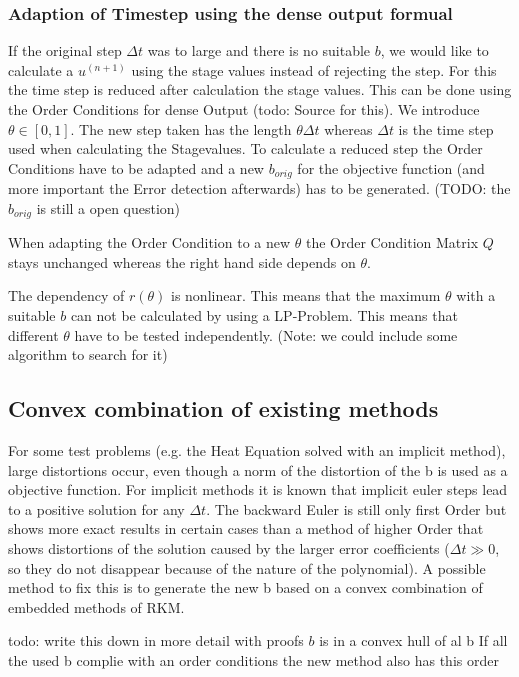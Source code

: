 \documentclass{article}
\begin{document}
\subsubsection{Adaption of Timestep using the dense output formual}

If the original step $\Delta t$ was to large and there is no suitable $b$, we would like to calculate a $u^(n+1)$ using the stage values instead of rejecting the step. For this the time step is reduced after calculation the stage values. This can be done using the Order Conditions for dense Output (todo: Source for this).
We introduce $\theta \in [0,1]$. The new step taken has the length $\theta \Delta t$ whereas $\Delta t$ is the time step used when calculating the Stagevalues.
To calculate a reduced step the Order Conditions have to be adapted and a new $b_{orig}$ for the objective function (and more important the Error detection afterwards) has to be generated. 
(TODO: the $b_{orig}$ is still a open question)

When adapting the Order Condition to a new $\theta$ the Order Condition Matrix $Q$ stays unchanged whereas the right hand side depends on $\theta$.

The dependency of $r(\theta)$ is nonlinear. This means that the maximum $\theta$ with a suitable $b$ can not be calculated by using a LP-Problem. This means that different $\theta$ have to be tested independently. 
(Note: we could include some algorithm to search for it)


\subsection{Convex combination of existing methods}
For some test problems (e.g. the Heat Equation solved with an implicit method), large distortions occur, even though a norm of the distortion of the b is used as a objective function. 
For implicit methods it is known that implicit euler steps lead to a positive solution for any $\Delta t$. The backward Euler is still only first Order but shows more exact results in certain cases than a method of higher Order that shows distortions of the solution caused by the larger error coefficients ($\Delta t \gg 0$, so they do not disappear because of the nature of the polynomial).
A possible method to fix this is to generate the new b based on a convex combination of embedded methods of RKM. 

todo: write this down in more detail with proofs
$b$ is in a convex hull of al b
If all the used b complie with an order conditions the new method also has this order
\end{document}

